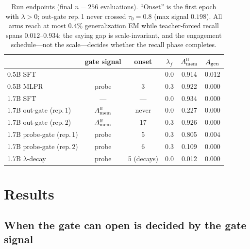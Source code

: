 \begin{table}[t]
\centering
\small
\setlength{\tabcolsep}{3.4pt}
\begin{tabular*}{\columnwidth}{@{\extracolsep{\fill}} l ccccc}
\toprule
 & gate signal & onset & $\lambda_f$ & $A_{\mathrm{mem}}^{\mathrm{lf}}$ & $A_{\mathrm{gen}}$ \\
\midrule
0.5B SFT           & ---        & ---      & 0.0 & 0.914 & 0.012 \\
0.5B MLPR          & probe      & 3        & 0.3 & 0.922 & 0.000 \\
\midrule
1.7B SFT           & ---        & ---      & 0.0 & 0.934 & 0.000 \\
1.7B out-gate (rep.\,1) & $A_{\mathrm{mem}}^{\mathrm{lf}}$ & never & 0.0 & 0.227 & 0.000 \\
1.7B out-gate (rep.\,2) & $A_{\mathrm{mem}}^{\mathrm{lf}}$ & 17  & 0.3 & 0.926 & 0.000 \\
1.7B probe-gate (rep.\,1) & probe & 5     & 0.3 & 0.805 & 0.004 \\
1.7B probe-gate (rep.\,2) & probe & 6     & 0.3 & 0.109 & 0.000 \\
1.7B $\lambda$-decay    & probe & 5 (decays) & 0.0 & 0.012 & 0.000 \\
\bottomrule
\end{tabular*}
\caption{Run endpoints (final $n{=}256$ evaluations). ``Onset'' is the
first epoch with $\lambda>0$; out-gate rep.\,1 never crossed
$\tau_0{=}0.8$ (max signal $0.198$). All arms reach at most $0.4\%$
generalization EM while teacher-forced recall spans
$0.012$--$0.934$: the saying gap is scale-invariant, and the
engagement schedule---not the scale---decides whether the recall
phase completes.}
\label{tab:main}
\end{table}

\section{Results}
\label{sec:results}

\subsection{When the gate can open is decided by the gate signal}
\label{sec:res:sat}

